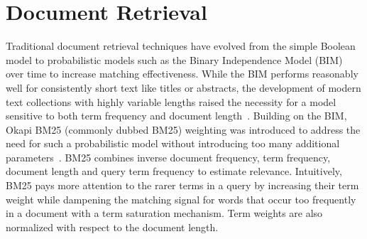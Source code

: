 
\section{Document Retrieval}
\label{non-neural-retrieval}

Traditional document retrieval techniques have evolved from the simple Boolean model to probabilistic models such as the Binary Independence Model (BIM) over time to increase matching effectiveness.
While the BIM performs reasonably well for consistently short text like titles or abstracts, the development of modern text collections with highly variable lengths raised the necessity for a model sensitive to both term frequency and document length~\cite{manning2010introduction}.
Building on the BIM, Okapi BM25 (commonly dubbed BM25) weighting was introduced to address the need for such a probabilistic model without introducing too many additional parameters~\cite{jones2000probabilistic}.
BM25 combines inverse document frequency, term frequency, document length and query term frequency to estimate relevance.
Intuitively, BM25 pays more attention to the rarer terms in a query by increasing their term weight while dampening the matching signal for words that occur too frequently in a document with a term saturation mechanism.
Term weights are also normalized with respect to the document length.

